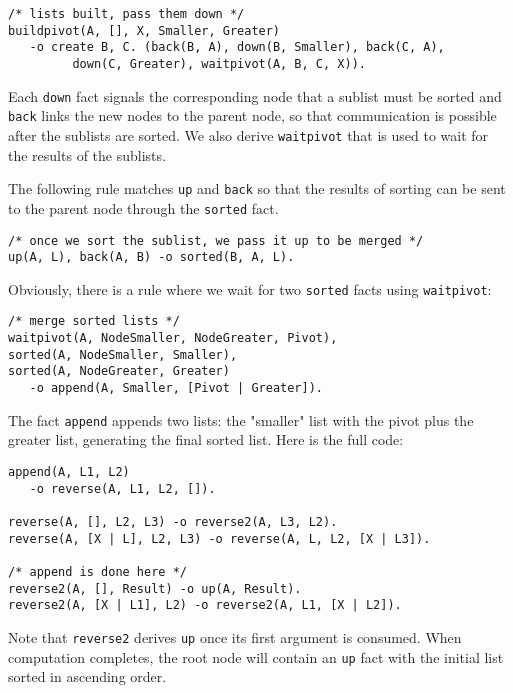 \documentclass[11pt]{article}
\begin{document}
\begin{verbatim}
/* lists built, pass them down */
buildpivot(A, [], X, Smaller, Greater)
   -o create B, C. (back(B, A), down(B, Smaller), back(C, A),
         down(C, Greater), waitpivot(A, B, C, X)).
\end{verbatim}

Each \texttt{down} fact signals the corresponding node that a sublist must be sorted and \texttt{back} links the new nodes to the parent node, so that communication is possible after the sublists are sorted. We also derive \texttt{waitpivot} that is used to wait for the results of the sublists.

The following rule matches \texttt{up} and \texttt{back} so that the results of sorting can be sent to the parent node through the \texttt{sorted} fact.

\begin{verbatim}
/* once we sort the sublist, we pass it up to be merged */
up(A, L), back(A, B) -o sorted(B, A, L).
\end{verbatim}

Obviously, there is a rule where we wait for two \texttt{sorted} facts using \texttt{waitpivot}:

\begin{verbatim}
/* merge sorted lists */
waitpivot(A, NodeSmaller, NodeGreater, Pivot),
sorted(A, NodeSmaller, Smaller),
sorted(A, NodeGreater, Greater)
   -o append(A, Smaller, [Pivot | Greater]).
\end{verbatim}

The fact \texttt{append} appends two lists: the "smaller" list with the pivot plus the greater list, generating the final sorted list. Here is the full code:

\begin{verbatim}
append(A, L1, L2)
   -o reverse(A, L1, L2, []).

reverse(A, [], L2, L3) -o reverse2(A, L3, L2).
reverse(A, [X | L], L2, L3) -o reverse(A, L, L2, [X | L3]).

/* append is done here */
reverse2(A, [], Result) -o up(A, Result).
reverse2(A, [X | L1], L2) -o reverse2(A, L1, [X | L2]).
\end{verbatim}

Note that \texttt{reverse2} derives \texttt{up} once its first argument is consumed. When computation completes, the root node will contain an \texttt{up} fact with the initial list sorted in ascending order.
\end{document}
